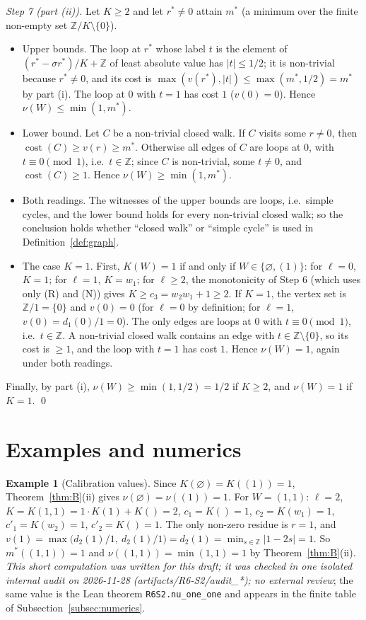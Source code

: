 \documentclass[11pt]{amsart}
\theoremstyle{definition}
\newtheorem{example}[theorem]{Example}
\theoremstyle{remark}
\newcommand{\Z}{\mathbb{Z}}
\newcommand{\cost}{\operatorname{cost}}
\begin{document}
\emph{Step 7 (part (ii)).} Let $K\ge2$ and let $r^*\ne0$ attain $m^*$ (a minimum over the finite non-empty set
$\Z/K\setminus\{0\}$).
\begin{itemize}
\item Upper bounds. The loop at $r^*$ whose label $t$ is the element of $(r^*-\sigma r^*)/K+\Z$ of least absolute value
has $|t|\le1/2$; it is non-trivial because $r^*\ne0$, and its cost is $\max(v(r^*),|t|)\le\max(m^*,1/2)=m^*$ by part
(i). The loop at $0$ with $t=1$ has cost $1$ ($v(0)=0$). Hence $\nu(W)\le\min(1,m^*)$.
\item Lower bound. Let $C$ be a non-trivial closed walk. If $C$ visits some $r\ne0$, then $\cost(C)\ge v(r)\ge m^*$.
Otherwise all edges of $C$ are loops at $0$, with $t\equiv0\pmod1$, i.e.\ $t\in\Z$; since $C$ is non-trivial, some
$t\ne0$, and $\cost(C)\ge1$. Hence $\nu(W)\ge\min(1,m^*)$.
\item Both readings. The witnesses of the upper bounds are loops, i.e.\ simple cycles, and the lower bound holds for
every non-trivial closed walk; so the conclusion holds whether ``closed walk'' or ``simple cycle'' is used in
Definition~\ref{def:graph}.
\item The case $K=1$. First, $K(W)=1$ if and only if $W\in\{\varnothing,(1)\}$: for $\ell=0$, $K=1$; for $\ell=1$,
$K=w_1$; for $\ell\ge2$, the monotonicity of Step 6 (which uses only (R) and (N)) gives $K\ge c_3=w_2w_1+1\ge2$. If
$K=1$, the vertex set is $\Z/1=\{0\}$ and $v(0)=0$ (for $\ell=0$ by definition; for $\ell=1$,
$v(0)=d_1(0)/1=0$). The only edges are loops at $0$ with $t\equiv0\pmod1$, i.e.\ $t\in\Z$. A non-trivial closed walk
contains an edge with $t\in\Z\setminus\{0\}$, so its cost is $\ge1$, and the loop with $t=1$ has cost $1$. Hence
$\nu(W)=1$, again under both readings.
\end{itemize}
Finally, by part (i), $\nu(W)\ge\min(1,1/2)=1/2$ if $K\ge2$, and $\nu(W)=1$ if $K=1$. \qed

\section{Examples and numerics}\label{sec:examples}

\begin{example}[Calibration values]\label{ex:calib}
Since $K(\varnothing)=K((1))=1$, Theorem~\ref{thm:B}(ii) gives $\nu(\varnothing)=\nu((1))=1$. For $W=(1,1)$:
$\ell=2$, $K=K(1,1)=1\cdot K(1)+K()=2$, $c_1=K()=1$, $c_2=K(w_1)=1$, $c'_1=K(w_2)=1$, $c'_2=K()=1$. The only
non-zero residue is $r=1$, and $v(1)=\max\bigl(d_2(1)/1,\ d_2(1)/1\bigr)=d_2(1)=\min_{s\in\Z}|1-2s|=1$. So
$m^*((1,1))=1$ and $\nu((1,1))=\min(1,1)=1$ by Theorem~\ref{thm:B}(ii). \emph{This short computation was written for this
draft; it was checked in one isolated internal audit on 2026-11-28 (artifacts/R6-S2/audit\_*); no external review}; the same value is the Lean theorem \texttt{R6S2.nu\_one\_one} and appears in the finite table
of Subsection~\ref{subsec:numerics}.
\end{example}
\end{document}

